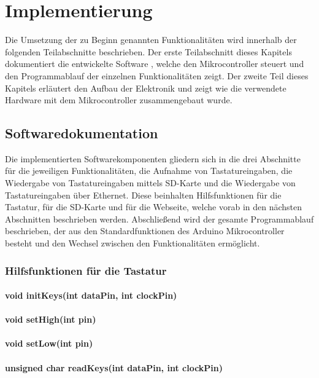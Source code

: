 \chapter{Implementierung}
Die Umsetzung der zu Beginn genannten Funktionalitäten wird innerhalb der folgenden Teilabschnitte beschrieben. Der erste Teilabschnitt dieses Kapitels dokumentiert die entwickelte Software \cite{badps2}, welche den Mikrocontroller steuert und den Programmablauf der einzelnen Funktionalitäten zeigt. Der zweite Teil dieses Kapitels erläutert den Aufbau der Elektronik und zeigt wie die verwendete Hardware mit dem Mikrocontroller zusammengebaut wurde.



\section{Softwaredokumentation}
Die implementierten Softwarekomponenten \cite{badps2} gliedern sich in die drei Abschnitte für die jeweiligen Funktionalitäten, die Aufnahme von Tastatureingaben, die Wiedergabe von Tastatureingaben mittels SD-Karte und die Wiedergabe von Tastatureingaben über Ethernet. Diese beinhalten Hilfsfunktionen für die Tastatur, für die SD-Karte und für die Webseite, welche vorab in den nächsten Abschnitten beschrieben werden. Abschließend wird der gesamte Programmablauf beschrieben, der aus den Standardfunktionen des Arduino Mikrocontroller besteht und den Wechsel zwischen den Funktionalitäten ermöglicht.

\subsection{Hilfsfunktionen für die Tastatur}
\subsubsection{void initKeys(int dataPin, int clockPin)}
\subsubsection{void setHigh(int pin)}
\subsubsection{void setLow(int pin)}
\subsubsection{unsigned char readKeys(int dataPin, int clockPin)}
